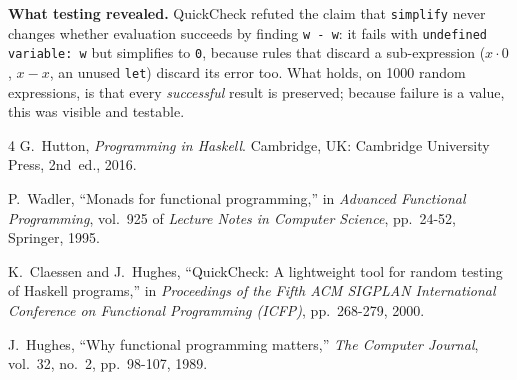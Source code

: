 \documentclass[12pt, a4paper]{report}
\newcommand{\code}[1]{\texttt{#1}}
\begin{document}
\textbf{What testing revealed.} QuickCheck refuted the claim that
\code{simplify} never changes whether evaluation succeeds by finding
\code{w - w}: it fails with \code{undefined variable: w} but simplifies to
\code{0}, because rules that discard a sub-expression ($x \cdot 0$, $x - x$,
an unused \code{let}) discard its error too. What holds, on 1000 random
expressions, is that every \emph{successful} result is preserved; because
failure is a value, this was visible and testable.

\begin{thebibliography}{4}
G.~Hutton, \emph{Programming in Haskell}. Cambridge, UK: Cambridge University
Press, 2nd~ed., 2016.

P.~Wadler, ``Monads for functional programming,'' in \emph{Advanced Functional
Programming}, vol.~925 of \emph{Lecture Notes in Computer Science},
pp.~24-52, Springer, 1995.

K.~Claessen and J.~Hughes, ``QuickCheck: A lightweight tool for random testing
of Haskell programs,'' in \emph{Proceedings of the Fifth ACM SIGPLAN
International Conference on Functional Programming (ICFP)}, pp.~268-279, 2000.

J.~Hughes, ``Why functional programming matters,'' \emph{The Computer
Journal}, vol.~32, no.~2, pp.~98-107, 1989.
\end{thebibliography}
\end{document}
